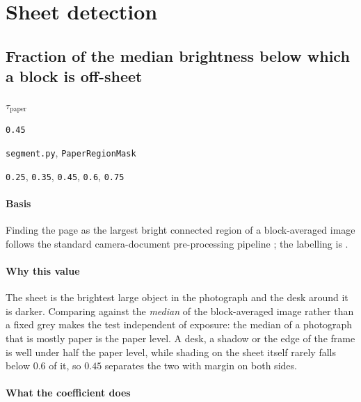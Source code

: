 \section{Sheet detection}

\subsection{Fraction of the median brightness below which a block is off-sheet}

\label{coef:paper-dark}

\begin{description}[leftmargin=5.2em,style=sameline]

\item[Symbol] $\tau_{\text{paper}}$

\item[Value] \texttt{0.45}

\item[Source] \texttt{segment.py}, \texttt{PaperRegionMask}

\item[Swept] \texttt{0.25}, \texttt{0.35}, \texttt{0.45}, \texttt{0.6}, \texttt{0.75}

\end{description}

\paragraph{Basis}

Finding the page as the largest bright connected region of a block-averaged image follows the standard camera-document pre-processing pipeline \cite{shafait2008}; the labelling is \cite{rosenfeld1966}.

\paragraph{Why this value}

The sheet is the brightest large object in the photograph and the desk around it is darker. Comparing against the \emph{median} of the block-averaged image rather than a fixed grey makes the test independent of exposure: the median of a photograph that is mostly paper is the paper level. A desk, a shadow or the edge of the frame is well under half the paper level, while shading on the sheet itself rarely falls below $0.6$ of it, so $0.45$ separates the two with margin on both sides.

\paragraph{What the coefficient does}

